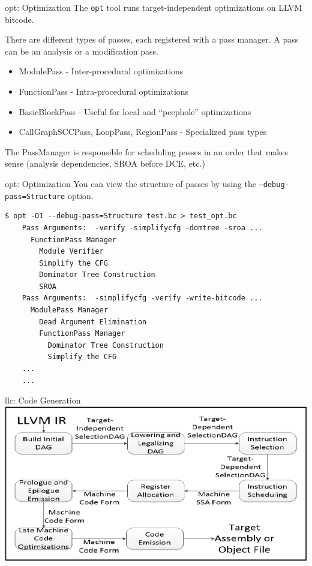 \documentclass{beamer}
\begin{document}
\begin{frame}{opt: Optimization}
    The \texttt{opt} tool runs target-independent optimizations on LLVM bitcode.

    \vspace{1ex}
    There are different types of passes, each registered with a pass manager. A pass can be an analysis or a modification pass.
    \begin{itemize}
        \item ModulePass - Inter-procedural optimizations
        \item FunctionPass - Intra-procedural optimizations
        \item BasicBlockPass - Useful for local and ``peephole'' optimizations
        \item CallGraphSCCPass, LoopPass, RegionPass - Specialized pass types
    \end{itemize}

    The PassManager is responsible for scheduling passes in an order that makes sense (analysis dependencies, SROA before DCE, etc.)
\end{frame}

\begin{frame}[fragile]{opt: Optimization}
    You can view the structure of passes by using the \texttt{--debug-pass=Structure} option.

    \begin{lstlisting}[gobble=4]
    $ opt -O1 --debug-pass=Structure test.bc > test_opt.bc
    Pass Arguments:  -verify -simplifycfg -domtree -sroa ...
      FunctionPass Manager
        Module Verifier
        Simplify the CFG
        Dominator Tree Construction
        SROA
    Pass Arguments:  -simplifycfg -verify -write-bitcode ...
      ModulePass Manager
        Dead Argument Elimination
        FunctionPass Manager
          Dominator Tree Construction
          Simplify the CFG
    ...
    ...
    \end{lstlisting}
\end{frame}


\begin{frame}{llc: Code Generation}
    \includegraphics[width=\textwidth]{images/llvm_codegen.png}
\end{frame}
\end{document}
